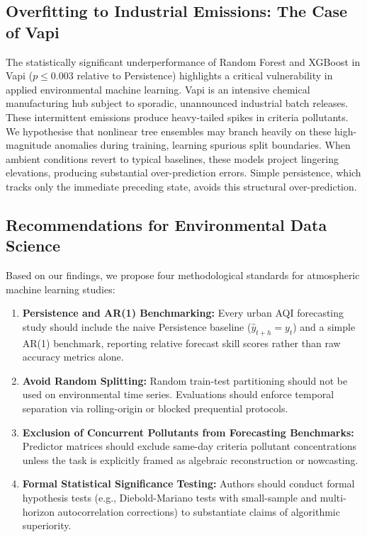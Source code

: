 \subsection{Overfitting to Industrial Emissions: The Case of Vapi}
The statistically significant underperformance of Random Forest and XGBoost in Vapi ($p \leq 0.003$ relative to Persistence) highlights a critical vulnerability in applied environmental machine learning. Vapi is an intensive chemical manufacturing hub subject to sporadic, unannounced industrial batch releases. These intermittent emissions produce heavy-tailed spikes in criteria pollutants. We hypothesise that nonlinear tree ensembles may branch heavily on these high-magnitude anomalies during training, learning spurious split boundaries. When ambient conditions revert to typical baselines, these models project lingering elevations, producing substantial over-prediction errors. Simple persistence, which tracks only the immediate preceding state, avoids this structural over-prediction.

\subsection{Recommendations for Environmental Data Science}
Based on our findings, we propose four methodological standards for atmospheric machine learning studies:
\begin{enumerate}
  \item \textbf{Persistence and AR(1) Benchmarking:} Every urban AQI forecasting study should include the naive Persistence baseline ($\hat{y}_{t+h} = y_t$) and a simple AR(1) benchmark, reporting relative forecast skill scores rather than raw accuracy metrics alone.
  \item \textbf{Avoid Random Splitting:} Random train-test partitioning should not be used on environmental time series. Evaluations should enforce temporal separation via rolling-origin or blocked prequential protocols.
  \item \textbf{Exclusion of Concurrent Pollutants from Forecasting Benchmarks:} Predictor matrices should exclude same-day criteria pollutant concentrations unless the task is explicitly framed as algebraic reconstruction or nowcasting.
  \item \textbf{Formal Statistical Significance Testing:} Authors should conduct formal hypothesis tests (e.g., Diebold-Mariano tests with small-sample and multi-horizon autocorrelation corrections) to substantiate claims of algorithmic superiority.
\end{enumerate}


